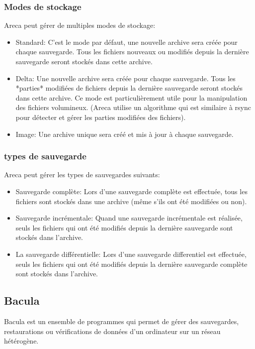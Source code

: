 \documentclass[a4paper,11pt]{report}
\begin{document}
\subsubsection {Modes de stockage}
Areca peut gérer de multiples modes de stockage:
\begin{itemize}
  \item Standard: C'est le mode par défaut, une nouvelle archive sera créée pour chaque sauvegarde. Tous les fichiers nouveaux ou modifiés depuis la dernière sauvegarde seront stockés dans cette archive.
  \item Delta: Une nouvelle archive sera créée pour chaque sauvegarde. Tous les *parties* modifiées de fichiers depuis la dernière sauvegarde seront stockés dans cette archive. Ce mode est particulièrement utile pour la manipulation des fichiers volumineux. (Areca utilise un algorithme qui est similaire à rsync pour détecter et gérer les parties modifiées des fichiers).
  \item Image: Une archive unique sera créé et mis à jour à chaque sauvegarde.
\end{itemize}

\subsubsection {types de sauvegarde}
Areca peut gérer les types de sauvegardes suivants:
\begin{itemize}
  \item Sauvegarde complète: Lors d'une sauvegarde complète est effectuée, tous les fichiers sont stockés dans une archive (même s'ils ont été modifiées ou non).
  \item Sauvegarde incrémentale: Quand une sauvegarde incrémentale est réalisée, seuls les fichiers qui ont été modifiés depuis la dernière sauvegarde sont stockés dans l'archive.
  \item La sauvegarde différentielle: Lors d'une sauvegarde differentiel est effectuée, seuls les fichiers qui ont été modifiés depuis la dernière sauvegarde complète sont stockés dans l'archive.
\end{itemize}

\subsection{Bacula}
Bacula est un ensemble de programmes qui permet de gérer des sauvegardes, restaurations ou vérifications de données d'un ordinateur sur un réseau hétérogène.
\end{document}
